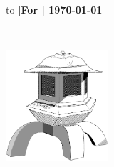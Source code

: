 \begin{titlepage}
\null\vskip-47pt
\hbox to \textwidth
{\bf [For \holnw{} \holnversion] { \hfil \today}}

\setcounter{page}{1}                      %

\vspace*{60mm}


{\selectfont
\begin{center}
 \\
\end{center}}

\begin{center}
\includegraphics[width=3.8cm]{../Logo/lantern}
\end{center}


\vfill
\end{titlepage}

\thispagestyle{empty}
\cleardoublepage







